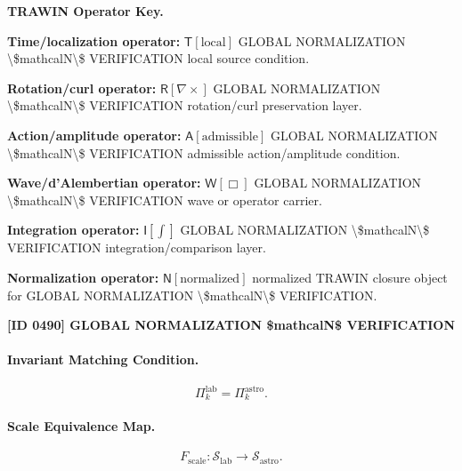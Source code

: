 \par\vspace{0.45\baselineskip}
\noindent\begin{minipage}[t]{\linewidth}
\begingroup
\small
\raggedright
\textbf{TRAWIN Operator Key.}\par
\noindent\textbf{Time/localization operator:} $\mathsf{T}\!\left[\mathrm{local}\right]$ GLOBAL NORMALIZATION \textbackslash{}\$mathcalN\textbackslash{}\$ VERIFICATION local source condition.\par
\noindent\textbf{Rotation/curl operator:} $\mathsf{R}\!\left[\nabla\times\right]$ GLOBAL NORMALIZATION \textbackslash{}\$mathcalN\textbackslash{}\$ VERIFICATION rotation/curl preservation layer.\par
\noindent\textbf{Action/amplitude operator:} $\mathsf{A}\!\left[\mathrm{admissible}\right]$ GLOBAL NORMALIZATION \textbackslash{}\$mathcalN\textbackslash{}\$ VERIFICATION admissible action/amplitude condition.\par
\noindent\textbf{Wave/d'Alembertian operator:} $\mathsf{W}\!\left[\Box\right]$ GLOBAL NORMALIZATION \textbackslash{}\$mathcalN\textbackslash{}\$ VERIFICATION wave or operator carrier.\par
\noindent\textbf{Integration operator:} $\mathsf{I}\!\left[\int\right]$ GLOBAL NORMALIZATION \textbackslash{}\$mathcalN\textbackslash{}\$ VERIFICATION integration/comparison layer.\par
\noindent\textbf{Normalization operator:} $\mathsf{N}\!\left[\mathrm{normalized}\right]$ normalized TRAWIN closure object for GLOBAL NORMALIZATION \textbackslash{}\$mathcalN\textbackslash{}\$ VERIFICATION.\par
\endgroup
\end{minipage}

\clearpage
\noindent\textbf{[ID 0490] GLOBAL NORMALIZATION \$mathcalN\$ VERIFICATION}\par
\vspace{0.35em}
\paragraph{Invariant Matching Condition.}
\begin{equation}
\Pi_k^{\mathrm{lab}}
=
\Pi_k^{\mathrm{astro}} .
\end{equation}

\paragraph{Scale Equivalence Map.}
\begin{equation}
F_{\mathrm{scale}}:
\mathcal{S}_{\mathrm{lab}}
\longrightarrow
\mathcal{S}_{\mathrm{astro}} .
\end{equation}

